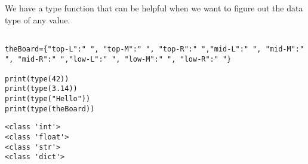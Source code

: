 \documentclass[11pt]{article}
\begin{document}
We have a type function that can be helpful when we want to figure out the data type of any value.


\begin{verbatim}

theBoard={"top-L":" ", "top-M":" ", "top-R":" ","mid-L":" ", "mid-M":" ", "mid-R":" ","low-L":" ", "low-M":" ", "low-R":" "}

print(type(42))
print(type(3.14))
print(type("Hello"))
print(type(theBoard))
\end{verbatim}

\begin{verbatim}
<class 'int'>
<class 'float'>
<class 'str'>
<class 'dict'>
\end{verbatim}
\end{document}
